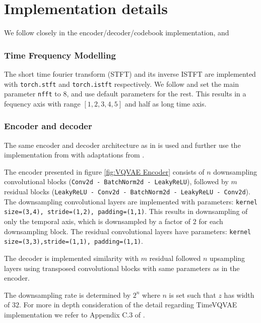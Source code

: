 \documentclass[../../thesis.tex]{subfiles}
\begin{document}
\section{Implementation details}
We follow \cite{TimeVQVAE} closely in the encoder/decoder/codebook implementation, and 

\subsubsection{Time Frequency Modelling}
The short time fourier transform (STFT) and its inverse ISTFT are implemented with \texttt{torch.stft} and \texttt{torch.istft} respectively. We follow \cite{TimeVQVAE} and set the main parameter \texttt{nfft} to $8$, and use default parameters for the rest. This results in a fequency axis with range $[1,2,3,4,5]$ and half as long time axis. \newline


\subsubsection{Encoder and decoder}

The same encoder and decoder architecture as in \cite{VQVAE} is used and further use the implementation from \cite{nadavbh12} with adaptations from \cite{TimeVQVAE}.\newline

The encoder presented in figure \ref{fig:VQVAE Encoder} consists of $n$ downsampling convolutional blocks (\texttt{Conv2d - BatchNorm2d - LeakyReLU}), followed by $m$ residual blocks (\texttt{LeakyReLU - Conv2d - BatchNorm2d - LeakyReLU - Conv2d}). The downsampling convolutional layers are implemented with parameters: \texttt{kernel size=(3,4),
stride=(1,2), padding=(1,1)}. This results in downsampling of only the temporal axis, which is downsampled by a factor of $2$ for each downsampling block. The residual convolutional layers have parameters: \texttt{kernel size=(3,3),stride=(1,1), padding=(1,1)}.\newline

The decoder is implemented similarity with $m$ residual followed $n$ upsampling layers using transposed convolutional blocks with same parameters as in the encoder.\newline

The downsampling rate is determined by $2^n$ where $n$ is set such that $z$ has width of $32$. For more in depth consideration of the detail regarding TimeVQVAE implementation we refer to Appendix C.3 of \cite{TimeVQVAE}.
\end{document}
